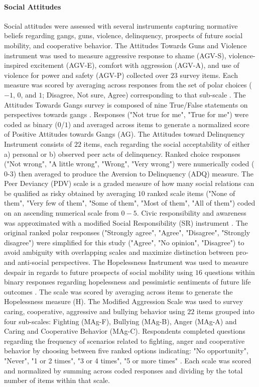 \documentclass[utf8]{article}
\begin{document}
\paragraph{Social Attitudes}
Social attitudes were assessed with several instruments capturing normative beliefs regarding gangs, guns, violence, delinquency, prospects of future social mobility, and cooperative behavior. The Attitudes Towards Guns and Violence instrument was used to measure aggressive response to shame (AGV-S), violence-inspired excitement (AGV-E), comfort with aggression (AGV-A), and use of violence for power and safety (AGV-P) collected over $23$ survey items. Each measure was scored by averaging across responses from the set of polar choices ($-1$, $0$, and $1$; Disagree, Not sure, Agree) corresponding to that sub-scale \citep{shapiro1997development}. The Attitudes Towards Gangs survey is composed of nine True/False statements on perspectives towards gangs \citep{nadel1996cycle}. Responses ("Not true for me", "True for me") were coded as binary ($0$/$1$) and averaged across items to generate a normalized score of Positive Attitudes towards Gangs (AG). The Attitudes toward Delinquency Instrument consists of $22$ items, each regarding the social acceptability of either a) personal or b) observed peer acts of delinquency. Ranked choice responses ("Not wrong", "A little wrong", "Wrong", "Very wrong") were numerically coded ($0$-$3$) then averaged to produce the Aversion to Delinquency (ADQ) measure. The Peer Deviancy (PDV) scale is a graded measure of how many social relations can be qualified as risky \citep{project2004multisite} obtained by averaging $10$ ranked scale items ("None of them", "Very few of them", "Some of them", "Most of them", "All of them") coded on an ascending numerical scale from $0-5$. Civic responsibility and awareness was approximated with a modified Social Responsibility (SR) instrument \citep{nedwek1998social}. The original ranked polar responses ("Strongly agree", "Agree", "Disagree", "Strongly disagree") were simplified for this study ("Agree", "No opinion", "Disagree") to avoid ambiguity with overlapping scales and maximize distinction between pro- and anti-social perspectives. The Hopelessness Instrument was used to measure despair in regards to future prospects of social mobility using $16$ questions within binary responses regarding hopelessness and pessimistic sentiments of future life outcomes \citep{kazdin1983hopelessness}. The scale was scored by averaging across items to generate the Hopelessness measure (H). The Modified Aggression Scale was used to survey caring, cooperative, aggressive and bullying behavior using $22$ items grouped into four sub-scales: Fighting (MAg-F), Bullying (MAg-B), Anger (MAg-A) and Caring and Cooperative Behavior (MAg-C). Respondents completed questions regarding the frequency of scenarios related to fighting, anger and cooperative behavior by choosing between five ranked options indicating: "No opportunity", "Never", "1 or 2 times", "3 or 4 times", "5 or more times" \citep{bosworth1995teen}. Each scale was scored and normalized by summing across coded responses and dividing by the total number of items within that scale. 
\end{document}

